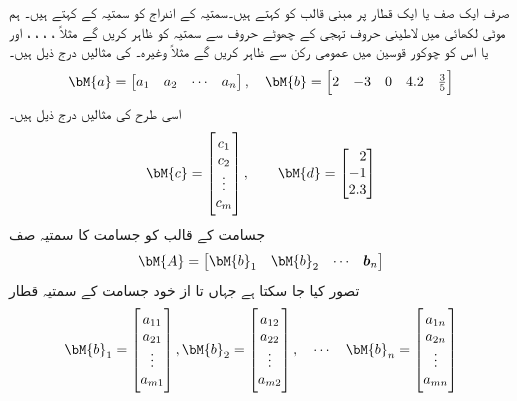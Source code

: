 صرف ایک صف یا ایک قطار پر مبنی قالب کو  کہتے ہیں۔سمتیہ کے اندراج کو سمتیہ کے  کہتے ہیں۔ ہم موٹی لکھائی میں لاطینی حروف تہجی  کے چھوٹے حروف سے سمتیہ کو ظاہر کریں گے مثلاً ، ، ، ، اور یا اس کو   چوکور قوسین میں عمومی رکن سے ظاہر کریں گے مثلاً  وغیرہ۔  کی مثالیں درج ذیل ہیں۔
\begin{align*}
\bM{a}=
\begin{bmatrix}
a_1& a_2 & \cdots & a_n
\end{bmatrix}, \quad 
\bM{b}=
\begin{bmatrix}
2& -3&0& 4.2& \tfrac{3}{5} 
\end{bmatrix}
\end{align*}
اسی طرح  کی مثالیں درج ذیل ہیں۔
\begin{align*}
\bM{c}=
\begin{bmatrix}
c_1\\
c_2\\
\vdots\\
c_m
\end{bmatrix}, \quad \quad
\bM{d}=
\begin{bmatrix*}[r]
2\\
-1\\
2.3
\end{bmatrix*}
\end{align*}
  جسامت کے قالب  کو  جسامت کا سمتیہ صف
\begin{align}
 \bM{A}=\begin{bmatrix} \bM{b}_1&\bM{b}_2&\cdots&\bm{b}_n \end{bmatrix}
\end{align}
تصور کیا جا سکتا ہے جہاں  تا  از خود   جسامت کے سمتیہ قطار 
\begin{align}
\bM{b}_1=\begin{bmatrix} a_{11} \\ a_{21}  \\ \vdots \\  a_{m1}  \end{bmatrix}, \bM{b}_2=\begin{bmatrix} a_{12} \\ a_{22}  \\ \vdots \\  a_{m2}  \end{bmatrix}, \quad \cdots \quad \bM{b}_n=\begin{bmatrix} a_{1n} \\ a_{2n}  \\ \vdots \\  a_{mn}  \end{bmatrix} 
\end{align}
